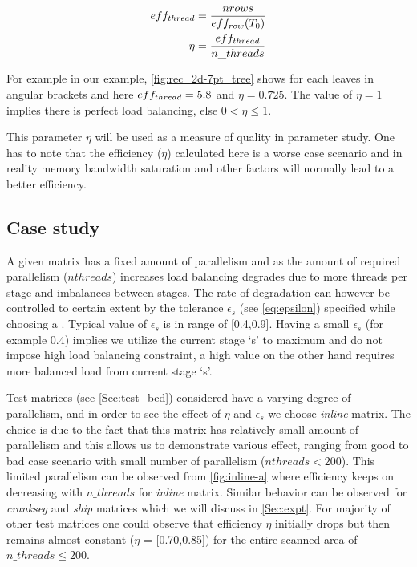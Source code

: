 \begin{align}
	\threadEffMath &= \frac{nrows}{\nrowsEffMath(T_0)} \\
	\eta &= \frac{\threadEffMath}{n\_threads} \label{eq:eta}
\end{align}

For example in our \STEX example, \cref{fig:rec_2d-7pt_tree} shows \nrowsEff for each leaves in angular brackets and here ${eff_{thread}} = 5.8$ and $\eta = 0.725$. The value of $\eta = 1$ implies there is perfect load balancing, else $0 < \eta \leq 1$.

This parameter $\eta$ will be used as a measure of quality in parameter study. One has to note that the efficiency ($\eta$) calculated here is a worse case scenario and in reality memory bandwidth saturation and other factors will normally lead to a better efficiency.

\subsection{Case study}
A given matrix has a fixed amount of parallelism and as the amount of required parallelism ($nthreads$) increases load balancing degrades due to more threads per stage and imbalances between stages. The rate of degradation can however be controlled to certain extent by the tolerance $\epsilon_s$ (see \cref{eq:epsilon}) specified while choosing a \levelGroup. Typical value of $\epsilon_s$ is in range of [0.4,0.9]. Having a small $\epsilon_s$ (for example 0.4) implies we utilize the current stage `s' to maximum and do not impose high load balancing constraint, a high value on the other hand requires more balanced load from current stage `s'. 

Test matrices (see \cref{Sec:test_bed}) considered have a varying degree of parallelism, and in order to see the effect of $\eta$ and $\epsilon_s$ we choose \emph{inline} matrix. The choice is due to the fact that this matrix has relatively small amount of parallelism and this allows us to demonstrate various effect, ranging from good to bad case scenario with small number of parallelism ($nthreads < 200$). This limited parallelism can be observed from \cref{fig:inline-a} 
where efficiency keeps on decreasing with $n\_threads$ for \emph{inline} matrix. Similar behavior can be observed for \emph{crankseg} and \emph{ship} matrices which we will discuss in \cref{Sec:expt}. For majority of other test matrices one could observe that efficiency $\eta$ initially drops but then remains almost constant ($\eta$ = [0.70,0.85]) for the entire scanned area of $n\_threads\leq200$.

